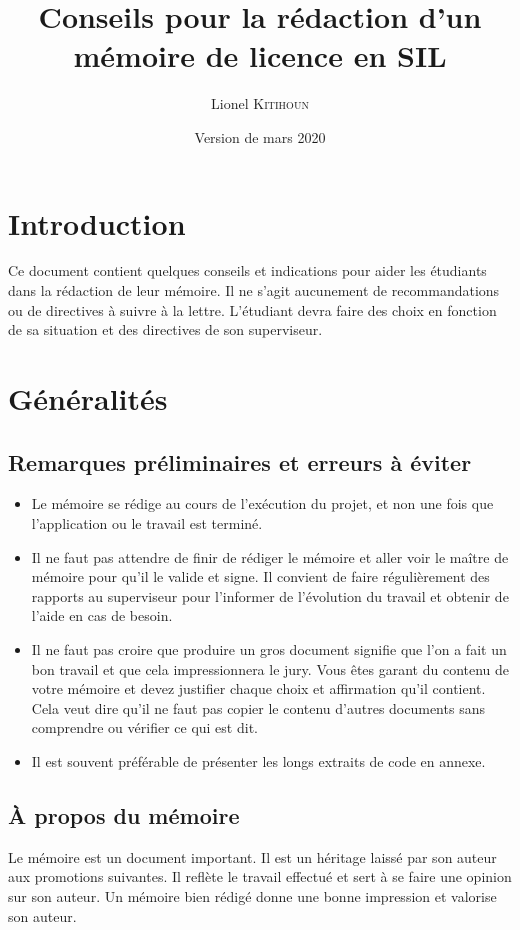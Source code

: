\documentclass[12pt]{article}
\title{Conseils pour la rédaction d'un mémoire de licence en SIL}
\author{Lionel K\textsc{itihoun}}
\date{Version de mars 2020}
\begin{document}
\maketitle

\section*{Introduction}
Ce document contient quelques conseils et indications pour aider les étudiants dans la rédaction de leur mémoire. Il ne s'agit aucunement de recommandations ou de directives à suivre à la lettre. L'étudiant devra faire des choix en fonction de sa situation et des directives de son superviseur.

\section{Généralités}

\subsection{Remarques préliminaires et erreurs à éviter}
\begin{itemize}
  \item Le mémoire se rédige au cours de  l'exécution du projet, et non une fois que l'application ou le travail est terminé.
  \item Il ne faut pas attendre de finir de rédiger le mémoire et aller voir le maître de mémoire pour qu'il le valide et signe. Il convient de faire régulièrement des rapports au superviseur pour l'informer de l'évolution du travail et obtenir de l'aide en cas de besoin.
  \item Il ne faut pas croire que produire un gros document signifie que l'on a fait un bon travail et que cela impressionnera le jury. Vous êtes garant du contenu de votre mémoire et devez justifier chaque choix et affirmation qu'il contient. Cela veut dire qu'il ne faut pas copier le contenu d'autres documents sans comprendre ou vérifier ce qui est dit.
  \item Il est souvent préférable de présenter les longs extraits de code en annexe.
\end{itemize}

\subsection{\`A propos du mémoire}
Le mémoire est un document important. Il est un héritage laissé par son auteur aux promotions suivantes. Il reflète le travail effectué et sert à se faire une opinion sur son auteur. Un mémoire bien rédigé donne une bonne impression et valorise son auteur.
\end{document}
